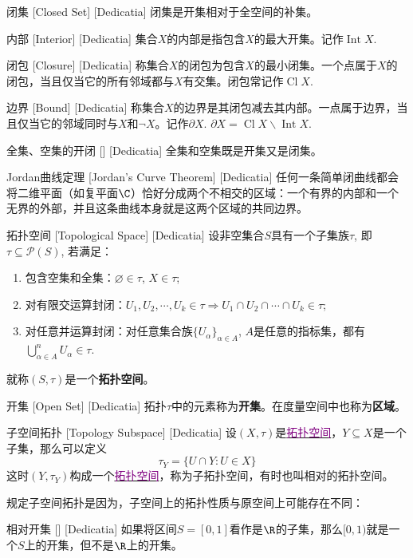 \documentclass[UTF8]{ctexart}
\newcommand{\hyperrefc}[2]{\hyperref[#1]{\textcolor{purple}{#2}}}
\begin{document}
\begin{dfn}
    [UUID]
    {闭集}
    [Closed Set]
    [Dedicatia]
    闭集是开集相对于全空间的补集。
\end{dfn}
\begin{dfn}
    [UUID]
    {内部}
    [Interior]
    [Dedicatia]
    集合$X$的内部是指包含$X$的最大开集。记作$\operatorname{Int}X$.
\end{dfn}
\begin{dfn}
    [UUID]
    {闭包}
    [Closure]
    [Dedicatia]
    称集合$X$的闭包为包含$X$的最小闭集。一个点属于$X$的闭包，当且仅当它的所有邻域都与$X$有交集。闭包常记作$\operatorname{Cl} X$.
\end{dfn}
\begin{dfn}
    [UUID]
    {边界}
    [Bound]
    [Dedicatia]
    称集合$X$的边界是其闭包减去其内部。一点属于边界，当且仅当它的邻域同时与$X$和$\lnot X$。记作$\partial X$. $\partial X=\operatorname{Cl} X\backslash\operatorname{Int} X$.
\end{dfn}
\begin{ppt}
    [UUID]
    {全集、空集的开闭}
    []
    [Dedicatia]
    全集和空集既是开集又是闭集。
\end{ppt}
\begin{thm}
    [UUID]
    {Jordan曲线定理}
    [Jordan's Curve Theorem]
    [Dedicatia]
    任何一条简单闭曲线都会将二维平面（如复平面$\C$）恰好分成两个不相交的区域：一个有界的内部和一个无界的外部，并且这条曲线本身就是这两个区域的共同边界。
\end{thm}
\begin{dfn}
    [UUID]
    {拓扑空间\label{dfn:TopologicalSpace}}
    [Topological Space]
    [Dedicatia]
    设非空集合$S$具有一个子集族$\tau$, 即$\tau\subseteq\mathcal{P}(S) $, 若满足：
    \begin{enumerate}
        \item 包含空集和全集：$\varnothing\in\tau$, $X\in\tau$;
        \item 对有限交运算封闭：$U_1,U_2,\cdots,U_k\in\tau\Longrightarrow U_1\cap U_2\cap\cdots\cap U_k\in\tau   $;
        \item 对任意并运算封闭：对任意集合族$\{U_\alpha\}_{\alpha\in A}$, $A$是任意的指标集，都有$\bigcup_{\alpha\in A}^n U_\alpha\in\tau$.
    \end{enumerate}
    就称$(S,\tau)$是一个\textbf{拓扑空间}。
\end{dfn}
\begin{ppt}
    [UUID]
    {开集}
    [Open Set]
    [Dedicatia]
    拓扑$\tau$中的元素称为\textbf{开集}。在度量空间中也称为\textbf{区域}。
\end{ppt}
\begin{dfn}
    [UUID]
    {子空间拓扑}
    [Topology Subspace]
    [Dedicatia]
    设$(X,\tau)$是\hyperrefc{dfn:TopologicalSpace}{拓扑空间}，$Y\subseteq X$是一个子集，那么可以定义
    \[\tau_Y=\{U\cap Y:U\in X\}\]
    这时$(Y,\tau_Y )$构成一个\hyperrefc{dfn:TopologicalSpace}{拓扑空间}，称为子拓扑空间，有时也叫相对的拓扑空间。
\end{dfn}
规定子空间拓扑是因为，子空间上的拓扑性质与原空间上可能存在不同：
\begin{xmp}
    [UUID]
    {相对开集}
    []
    [Dedicatia]
    如果将区间$S=[0,1]$看作是$\R$的子集，那么$[0,1)$就是一个$S$上的开集，但不是$\R$上的开集。
\end{xmp}
\end{document}

